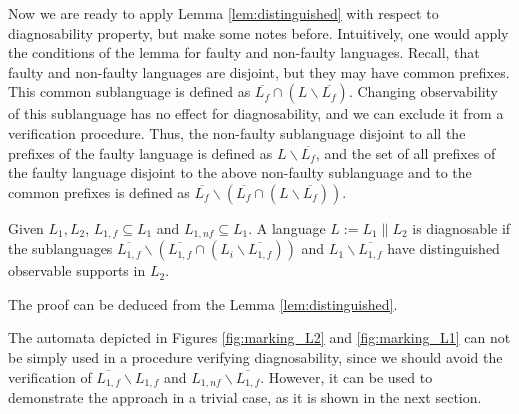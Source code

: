 Now we are ready to apply Lemma \ref{lem:distinguished} with respect to
diagnosability property, but make some notes before. Intuitively, one would
apply the conditions of the lemma for faulty and non-faulty languages. Recall,
that faulty and non-faulty languages are disjoint, but they may have common
prefixes. This common sublanguage is defined as $\overline{L_{f}} \cap (L
\backslash \overline{L_{f}})$. Changing observability of this sublanguage has no
effect for diagnosability, and we can exclude it from a verification procedure.
Thus, the non-faulty sublanguage disjoint to all the prefixes of the faulty
language is defined as $L \backslash \overline{L_f}$, and the set of all
prefixes of the faulty language disjoint to the above non-faulty sublanguage and
to the common prefixes is defined as $\overline{L_f} \backslash (\overline{L_f}
\cap (L \backslash \overline{L_f}))$.

\begin{lemma}
\label{lem:diagnosable}
Given $L_1, L_2$, $L_{1,f} \subseteq L_1$ and $L_{1,nf} \subseteq L_1$. A
language $L := L_1 \parallel L_2$ is diagnosable if the sublanguages
$\overline{L_{1,f}} \backslash (\overline{L_{1,f}} \cap (L_i \backslash
\overline{L_{1,f}}))$ and $L_{1} \backslash \overline{L_{1,f}}$ have
distinguished observable supports in $L_2$.
\end{lemma}
The proof can be deduced from the Lemma \ref{lem:distinguished}. 

The automata depicted in Figures \ref{fig:marking_L2} and \ref{fig:marking_L1}
can not be simply used in a procedure verifying diagnosability, since we should
avoid the verification of $\overline{L_{1,f}} \backslash L_{1,f}$ and $L_{1,nf}
\backslash \overline{L_{1,f}}$. However, it can be used to demonstrate
the approach in a trivial case, as it is shown in the next section.


